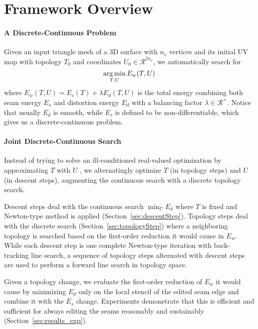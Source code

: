 
\section{Framework Overview}

\paragraph{A Discrete-Continuous Problem}

Given an input triangle mesh of a 3D surface with $n_v$ vertices and its initial UV map with topology $T_0$ and coordinates $U_0 \in \mathcal{R}^{2n_v}$, we automatically search for
\[ \operatorname*{arg\,min}_{T,U} E_w(T,U) \]
where $E_w(T,U) = E_s(T) + \lambda E_d(T,U)$ is the total energy combining both seam energy $E_s$ and distortion energy $E_d$ with a balancing factor $\lambda \in \mathcal{R^+}$. Notice that usually $E_d$ is smooth, while $E_s$ is defined to be non-differentiable, which gives us a discrete-continuous problem.

\paragraph{Joint Discrete-Continuous Search}

Instead of trying to solve an ill-conditioned real-valued optimization by approximating $T$ with $U$ \cite{Poranne2017Autocuts}, we alternatingly optimize $T$ (in topology steps) and $U$ (in descent steps), augmenting the continuous search with a discrete topology search.

Descent steps deal with the continuous search
$\min_U E_d$
where $T$ is fixed and Newton-type method is applied (Section~\ref{sec:descentStep}).
Topology steps deal with the discrete search (Section~\ref{sec:topologyStep}) where a neighboring topology is searched based on the first-order reduction it would cause in $E_w$.
While each descent step is one complete Newton-type iteration with back-tracking line search, a sequence of topology steps alternated with descent steps are used to perform a forward line search in topology space. 

Given a topology change, we evaluate the first-order reduction of $E_w$ it would cause by minimizing $E_d$ only on the local stencil of the edited seam edge and combine it with the $E_s$ change. Experiments demonstrate that this is efficient and sufficient for always editing the seams reasonably and sustainably (Section~\ref{sec:results_exp}).

